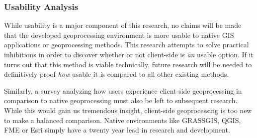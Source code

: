 \subsubsection*{Usability Analysis} %

While usability is a major component of this research, no claims will be made that the developed geoprocessing environment is more usable to native GIS applications or geoprocessing methods. This research attempts to solve practical inhibitions in order to discover whether or not client-side is \emph{an} usable option. If it turns out that this method is viable technically, future research will be needed to definitively proof \emph{how} usable it is compared to all other existing methods.  


Similarly, a survey analyzing how users experience client-side geoprocessing in comparison to native geoprocessing must also be left to subsequent research. While this would gain us tremendous insight, client-side geoprocessing is too new to make a balanced comparison. Native environments like GRASSGIS, QGIS, FME or Esri simply have a twenty year lead in research and development. 
